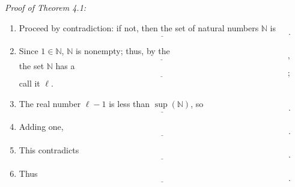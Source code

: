 \documentclass[12pt]{amsart}
\newcommand{\N}{\mathbb{N}}
\begin{document}
\noindent \textit{Proof of Theorem 4.1:}
\begin{enumerate}
\item Proceed by contradiction: if not, then the set of natural numbers $\N$ is 
\[ \underline{\phantom{ \qquad \qquad \qquad \qquad \qquad\qquad \qquad \qquad \qquad \qquad\qquad \qquad \qquad \qquad \qquad }}.\]
\item Since $1\in \N$, $\N$ is nonempty; thus, by the  
\[ \underline{\phantom{ \qquad\qquad \qquad \qquad \qquad\qquad \qquad \qquad \qquad \qquad\qquad \qquad \qquad \qquad \qquad }},\] the set $\N$ has a \[ \underline{\phantom{ \qquad \qquad \qquad \qquad \qquad\qquad \qquad \qquad \qquad \qquad \qquad \qquad \qquad  \qquad \qquad}};\] call it $\ell$.

\item The real number $\ell-1$ is less than $\sup(\N)$, so 
\[ \underline{\phantom{ \qquad\qquad \qquad \qquad \qquad\qquad \qquad \qquad \qquad \qquad\qquad \qquad \qquad \qquad \qquad }}.\]
\item Adding one, 
\[ \underline{\phantom{ \qquad\qquad \qquad \qquad \qquad\qquad \qquad \qquad \qquad \qquad\qquad \qquad \qquad \qquad \qquad }}.\]
\item This contradicts
\[ \underline{\phantom{ \qquad\qquad \qquad \qquad \qquad\qquad \qquad \qquad \qquad \qquad\qquad \qquad \qquad \qquad \qquad }}.\]
\item Thus
\[ \underline{\phantom{ \qquad\qquad \qquad \qquad \qquad\qquad \qquad \qquad \qquad \qquad\qquad \qquad \qquad \qquad \qquad }}.\]
\end{enumerate}
\end{document}
